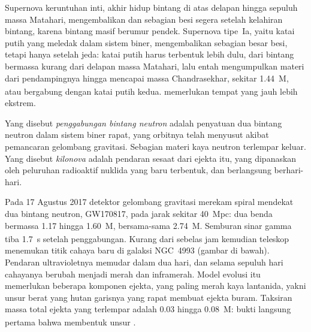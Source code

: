 Supernova keruntuhan inti, akhir hidup bintang di atas delapan hingga sepuluh
massa Matahari, mengembalikan  dan sebagian besi segera setelah
kelahiran bintang, karena bintang masif berumur pendek. Supernova tipe~Ia,
yaitu katai putih yang meledak dalam sistem biner, mengembalikan sebagian besar
besi, tetapi hanya setelah jeda: katai putih harus terbentuk lebih dulu, dari
bintang bermassa kurang dari delapan massa Matahari, lalu entah mengumpulkan materi dari
pendampingnya hingga mencapai massa Chandrasekhar, sekitar
\qty{1.44}{M_\odot}, atau bergabung dengan katai putih kedua.  memerlukan
tempat yang jauh lebih ekstrem.

\begin{definition}\label{def:b3:origin-of-elements:kilonova}
Yang disebut \emph{penggabungan bintang neutron} adalah
penyatuan dua bintang neutron dalam sistem biner rapat, yang orbitnya telah
menyusut akibat pemancaran gelombang gravitasi. Sebagian materi kaya neutron
terlempar keluar. Yang disebut \emph{kilonova} adalah pendaran sesaat
dari ejekta itu, yang dipanaskan oleh peluruhan radioaktif nuklida
 yang baru terbentuk, dan berlangsung berhari-hari.
\end{definition}

Pada 17 Agustus 2017 detektor gelombang gravitasi merekam
spiral mendekat dua bintang neutron, GW170817, pada jarak sekitar
\qty{40}{Mpc}: dua benda bermassa \num{1.17} hingga \qty{1.60}{M_\odot}, bersama-sama
\qty{2.74}{M_\odot}. Semburan sinar gamma tiba \qty{1.7}{s} setelah
penggabungan. Kurang dari sebelas jam kemudian teleskop menemukan titik cahaya baru
di galaksi NGC~4993 (gambar di bawah). Pendaran ultravioletnya memudar
dalam dua hari, dan selama sepuluh hari cahayanya berubah menjadi merah dan inframerah.
Model evolusi itu memerlukan beberapa komponen ejekta, yang
paling merah kaya lantanida, yakni unsur berat  yang
hutan garisnya yang rapat membuat ejekta buram. Taksiran massa total ejekta
yang terlempar adalah \num{0.03} hingga \qty{0.08}{M_\odot}: bukti langsung pertama
bahwa  membentuk unsur .

